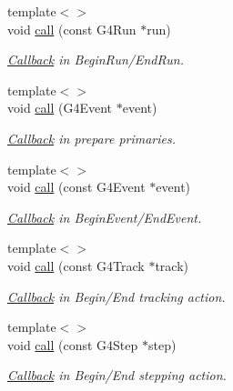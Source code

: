 \begin{DoxyCompactItemize}
\item 
{\footnotesize template$<$$>$ }\\void \hyperlink{class_d_d4hep_1_1_simulation_1_1_geant4_action_phase_ae866431033c441eca344ef5790755c35}{call} (const G4Run $\ast$run)
\begin{DoxyCompactList}\small\item\em \hyperlink{class_d_d4hep_1_1_callback}{Callback} in BeginRun/EndRun. \item\end{DoxyCompactList}\item 
{\footnotesize template$<$$>$ }\\void \hyperlink{class_d_d4hep_1_1_simulation_1_1_geant4_action_phase_ad645b1ab9a7a1df5b464e3a6fb4df887}{call} (G4Event $\ast$event)
\begin{DoxyCompactList}\small\item\em \hyperlink{class_d_d4hep_1_1_callback}{Callback} in prepare primaries. \item\end{DoxyCompactList}\item 
{\footnotesize template$<$$>$ }\\void \hyperlink{class_d_d4hep_1_1_simulation_1_1_geant4_action_phase_ad2d3a9e9414b4808875fa59dd022a310}{call} (const G4Event $\ast$event)
\begin{DoxyCompactList}\small\item\em \hyperlink{class_d_d4hep_1_1_callback}{Callback} in BeginEvent/EndEvent. \item\end{DoxyCompactList}\item 
{\footnotesize template$<$$>$ }\\void \hyperlink{class_d_d4hep_1_1_simulation_1_1_geant4_action_phase_af0f665dd43b54a635ebdb739c21f50e3}{call} (const G4Track $\ast$track)
\begin{DoxyCompactList}\small\item\em \hyperlink{class_d_d4hep_1_1_callback}{Callback} in Begin/End tracking action. \item\end{DoxyCompactList}\item 
{\footnotesize template$<$$>$ }\\void \hyperlink{class_d_d4hep_1_1_simulation_1_1_geant4_action_phase_a1ae70049ecebbd987436c44338081dfc}{call} (const G4Step $\ast$step)
\begin{DoxyCompactList}\small\item\em \hyperlink{class_d_d4hep_1_1_callback}{Callback} in Begin/End stepping action. \item\end{DoxyCompactList}\item 

\end{DoxyCompactItemize}
